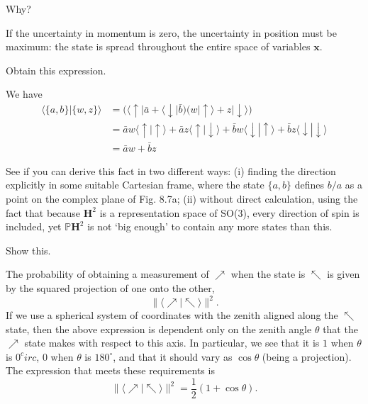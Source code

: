\documentclass[../road-to-reality.tex]{subfiles}
\begin{document}
\begin{questions}
\question Why?

\begin{solution}
	If the uncertainty in momentum is zero, the uncertainty in position must be maximum: the state is spread throughout the entire space of variables $\mathbf{x}$.
\end{solution}

\question Obtain this expression.

\begin{solution}
	We have
	\begin{align*}
		\langle\{a, b\}|\{w, z\}\rangle &= \big(\langle\uparrow\!|\bar{a} + \langle\downarrow\!|\bar{b}\big)\big(w|\!\uparrow\rangle + z|\!\downarrow\rangle\big) \\
		&= \bar{a}w\langle\uparrow\!|\!\uparrow\rangle + \bar{a}z\langle\uparrow\!|\!\downarrow\rangle + \bar{b}w\langle\downarrow\!|\!\uparrow\rangle + \bar{b}z\langle\downarrow\!|\!\downarrow\rangle \\
		&= \bar{a}w + \bar{b}z
	\end{align*}
\end{solution}

\question See if you can derive this fact in two different ways: (i) finding the direction explicitly in some suitable Cartesian frame, where the state $\{a, b\}$ defines $b/a$ as a point on the complex plane of Fig. 8.7a; (ii) without direct calculation, using the fact that because $\mathbf{H}^2$ is a representation space of SO(3), every direction of spin is included, yet $\mathbb{P}\mathbf{H}^2$ is not `big enough' to contain any more states than this.

\question Show this.

\begin{solution}
	The probability of obtaining a measurement of $\nearrow$ when the state is $\nwarrow$ is given by the squared projection of one onto the other,
	\[
		\|\langle\nearrow|\nwarrow\rangle\|^2.
	\]
	If we use a spherical system of coordinates with the zenith aligned along the $\nwarrow$ state, then the above expression is dependent only on the zenith angle $\theta$ that the $\nearrow$ state makes with respect to this axis. In particular, we see that it is $1$ when $\theta$ is $0^circ$, $0$ when $\theta$ is $180^\circ$, and that it should vary as $\cos\theta$ (being a projection). The expression that meets these requirements is
	\[
		\|\langle\nearrow|\nwarrow\rangle\|^2 = \frac{1}{2}(1 + \cos\theta).
	\]
\end{solution}


\end{questions}
\end{document}
